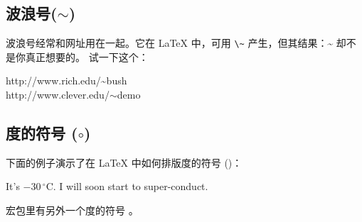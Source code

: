 
\subsection{波浪号\texorpdfstring{($\sim$)}{}}

波浪号经常和网址用在一起。它在
 \LaTeX{} 中，可用 \verb|\~| 产生，但其结果：\~{} 却不是你真正想要的。
试一下这个：

%
\begin{example}
http://www.rich.edu/\~{}bush \\
http://www.clever.edu/$\sim$demo
\end{example}

\subsection{度的符号\texorpdfstring{ ($\circ$)}{}}

下面的例子演示了在 \LaTeX{} 中如何排版度的符号 ()：

\begin{example}
It's $-30\,^{\circ}\mathrm{C}$.
I will soon start to
super-conduct.
\end{example}

 宏包里有另外一个度的符号 。


